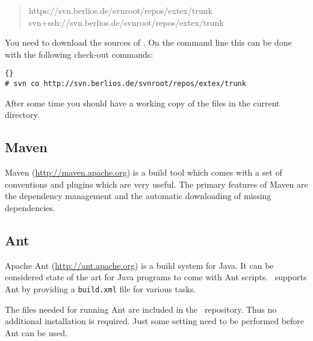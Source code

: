\begin{quotation}
  https://svn.berlios.de/svnroot/repos/extex/trunk
  svn+ssh://svn.berlios.de/svnroot/repos/extex/trunk
\end{quotation}

You need to download the sources of \ExTeX. On the
command line this can be done with the following
check-out commands:

\begin{lstlisting}{}
# svn co http://svn.berlios.de/svnroot/repos/extex/trunk
\end{lstlisting}{}

After some time you should have a working copy of the files in the
current directory.


\subsection{Maven}\label{sec:Maven}

Maven (\url{http://maven.apache.org}) is a build tool which comes with a
set of conventions and plugins which are very useful. The primary
features of Maven are the dependency management and the automatic
downloading of missing dependencies.

%
%
%

\subsection{Ant}\label{sec:Ant}

Apache Ant (\url{http://ant.apache.org}) is a build system for Java.
It can be considered state of the art for Java programs to come with
Ant scripts. \ExTeX\ supports Ant by providing a \texttt{build.xml}
file for various tasks.

The files needed for running Ant are included in the \ExTeX\
repository. Thus no additional installation is required. Just some
setting need to be performed before Ant can be used.

